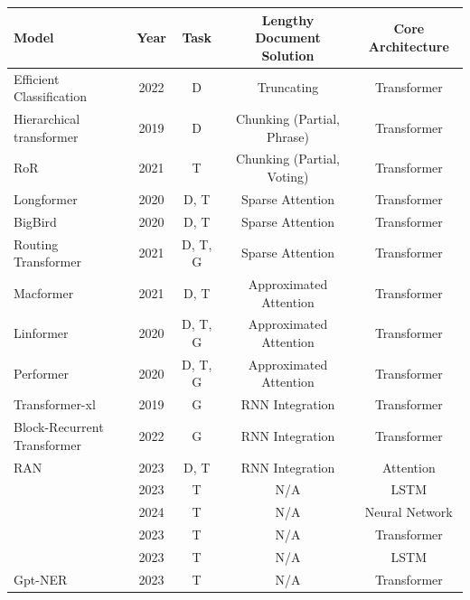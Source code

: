 \documentclass[11pt]{article}
\begin{document}
\begin{table}[!ht]
    \centering
    \scriptsize
    \setlength{\tabcolsep}{13pt}
    \begin{tabular}{l|cccc}
    \hline
        \textbf{Model} & \textbf{Year} & \textbf{Task} & \textbf{Lengthy Document Solution} & \textbf{Core Architecture} \\ \hline
        Efficient Classification \citep{park2022efficient} & 2022 & D & Truncating & Transformer  \\ 
        Hierarchical transformer \citep{pappagari2019hierarchical} & 2019 & D & Chunking (Partial, Phrase)& Transformer  \\ 
        RoR \citep{zhao2021ror} & 2021 & T & Chunking (Partial, Voting) & Transformer  \\ 
        Longformer \citep{beltagy2020longformer} & 2020 & D, T & Sparse Attention & Transformer  \\ 
        BigBird \citep{zaheer2020big} & 2020 & D, T & Sparse Attention & Transformer  \\ 
        Routing Transformer \citep{roy2021efficient} & 2021 & D, T, G & Sparse Attention & Transformer  \\ 
        Macformer \citep{peng2021random} & 2021 & D, T & Approximated Attention & Transformer  \\ 
        Linformer \citep{wang2020linformer} & 2020 & D, T, G & Approximated Attention & Transformer  \\ 
        Performer \citep{choromanski2020masked} & 2020 & D, T, G & Approximated Attention & Transformer  \\ 
        Transformer-xl \citep{dai2019transformer} & 2019 & G & RNN Integration & Transformer  \\ 
        Block-Recurrent Transformer \citep{hutchins2022block} & 2022 & G & RNN Integration & Transformer  \\ 
        RAN \citep{li-etal-2023-recurrent} & 2023 & D, T & RNN Integration & Attention  \\ 
        \citep{ccetindaug2023named} & 2023 & T & N/A & LSTM  \\ 
        \citep{mengliev2024developing} & 2024 & T & N/A & Neural Network  \\ 
        \citep{park2023web} & 2023 & T & N/A & Transformer  \\ 
        \citep{bhattacharya2023improving} & 2023 & T & N/A & LSTM  \\ 
        Gpt-NER \citep{wang2023gpt} & 2023 & T & N/A & Transformer  \\ 

\end{tabular}
\end{table}
\end{document}
